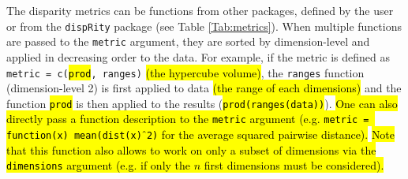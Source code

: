 \documentclass[12pt,letterpaper]{article}
\newcommand{\disp}{\texttt{dispRity} }
\begin{document}
The disparity metrics can be functions from other packages, defined by the user or from the \disp package (see Table \ref{Tab:metrics}).
When multiple functions are passed to the \texttt{metric} argument, they are sorted by dimension-level and applied in decreasing order to the data.
For example, if the metric is defined as \texttt{metric = c(\hl{prod}, ranges)} \hl{(the hypercube volume)}, the \texttt{ranges} function (dimension-level 2) is first applied to data \hl{(the range of each dimensions)} and the function \hl{\texttt{prod}} is then applied to the results (\hl{\texttt{prod(ranges(data))}}).
\hl{One can also directly pass a function description to the \texttt{metric} argument (e.g. \texttt{metric = function(x) mean(dist(x)$\hat{\mkern6mu}$2)} for the average squared pairwise distance).}
\hl{Note that this function also allows to work on only a subset of dimensions via the \texttt{dimensions} argument (e.g. if only the $n$ first dimensions must be considered).}
\end{document}

